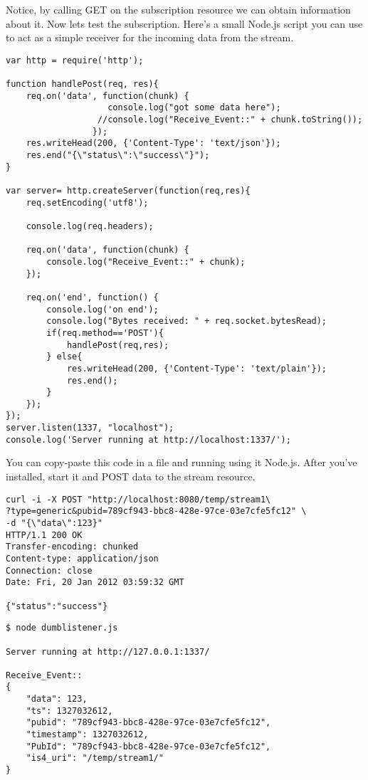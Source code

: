 Notice, by calling GET on the subscription resource we can obtain information about it. Now lets test the subscription. Here's a small  Node.js script you can use to act as a simple receiver for the incoming data from the stream.

\begin{lstlisting}
var http = require('http');

function handlePost(req, res){
    req.on('data', function(chunk) {
                    console.log("got some data here");
                  //console.log("Receive_Event::" + chunk.toString());
                 });
    res.writeHead(200, {'Content-Type': 'text/json'});
    res.end("{\"status\":\"success\"}");
}

var server= http.createServer(function(req,res){
    req.setEncoding('utf8');

    console.log(req.headers);

    req.on('data', function(chunk) {
        console.log("Receive_Event::" + chunk);
    });

    req.on('end', function() {
        console.log('on end');
        console.log("Bytes received: " + req.socket.bytesRead);
        if(req.method=='POST'){
            handlePost(req,res);
        } else{
            res.writeHead(200, {'Content-Type': 'text/plain'});
            res.end();
        }
    });
});
server.listen(1337, "localhost");
console.log('Server running at http://localhost:1337/');
\end{lstlisting}

You can copy-paste this code in a file and running using it  Node.js. After you've installed, start it and POST data to the stream resource.

\begin{lstlisting}
curl -i -X POST "http://localhost:8080/temp/stream1\
?type=generic&pubid=789cf943-bbc8-428e-97ce-03e7cfe5fc12" \
-d "{\"data\":123}"
HTTP/1.1 200 OK
Transfer-encoding: chunked
Content-type: application/json
Connection: close
Date: Fri, 20 Jan 2012 03:59:32 GMT

{"status":"success"}
\end{lstlisting}

\begin{lstlisting}
$ node dumblistener.js 

Server running at http://127.0.0.1:1337/
    
Receive_Event::
{
    "data": 123,
    "ts": 1327032612,
    "pubid": "789cf943-bbc8-428e-97ce-03e7cfe5fc12",
    "timestamp": 1327032612,
    "PubId": "789cf943-bbc8-428e-97ce-03e7cfe5fc12",
    "is4_uri": "/temp/stream1/"
}
\end{lstlisting}

